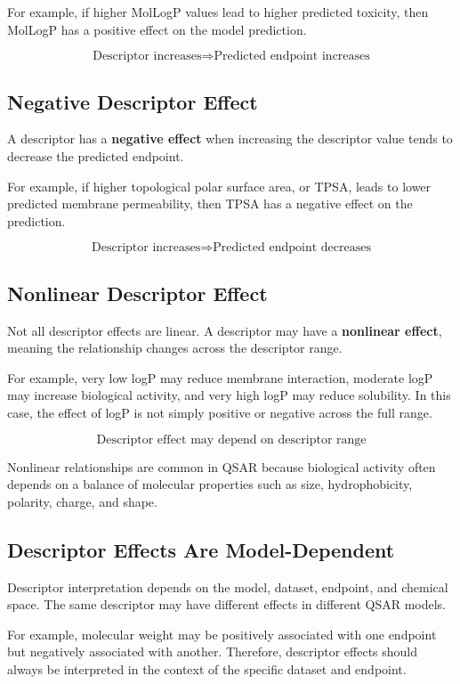 \documentclass[11pt]{report}
\newenvironment{Important note}{\begin{quote}\color{red}\textbf{Important note:} }{\end{quote}}
\begin{document}
For example, if higher MolLogP values lead to higher predicted toxicity, then MolLogP has a positive effect on the model prediction.

\[
\text{Descriptor increases} \Rightarrow \text{Predicted endpoint increases}
\]

\subsection{Negative Descriptor Effect}

A descriptor has a \textbf{negative effect} when increasing the descriptor value tends to decrease the predicted endpoint.

For example, if higher topological polar surface area, or TPSA, leads to lower predicted membrane permeability, then TPSA has a negative effect on the prediction.

\[
\text{Descriptor increases} \Rightarrow \text{Predicted endpoint decreases}
\]

\subsection{Nonlinear Descriptor Effect}

Not all descriptor effects are linear. A descriptor may have a \textbf{nonlinear effect}, meaning the relationship changes across the descriptor range.

For example, very low logP may reduce membrane interaction, moderate logP may increase biological activity, and very high logP may reduce solubility. In this case, the effect of logP is not simply positive or negative across the full range.

\[
\text{Descriptor effect may depend on descriptor range}
\]

Nonlinear relationships are common in QSAR because biological activity often depends on a balance of molecular properties such as size, hydrophobicity, polarity, charge, and shape.

\subsection{Descriptor Effects Are Model-Dependent}

Descriptor interpretation depends on the model, dataset, endpoint, and chemical space. The same descriptor may have different effects in different QSAR models.

For example, molecular weight may be positively associated with one endpoint but negatively associated with another. Therefore, descriptor effects should always be interpreted in the context of the specific dataset and endpoint.
\end{document}
